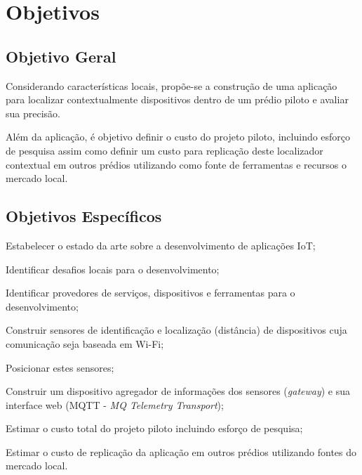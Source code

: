 
\section{Objetivos}
\label{sec:Objetivos}

\subsection{Objetivo Geral}
\label{subsec:Objetivo Geral}

Considerando características locais, propõe-se a construção de uma aplicação
para localizar contextualmente dispositivos dentro de um prédio piloto e avaliar
sua precisão.

Além da aplicação, é objetivo definir o custo do projeto piloto, incluindo
esforço de pesquisa assim como definir um custo para replicação deste
localizador contextual em outros prédios utilizando como fonte de ferramentas e
recursos o mercado local.

\subsection{Objetivos Específicos}
\label{subsec:Objetivos Específicos}

\begin{alineas}

	\item Estabelecer o estado da arte sobre a desenvolvimento de aplicações IoT;

	\item Identificar desafios locais para o desenvolvimento;

	\item Identificar provedores de serviços, dispositivos e ferramentas para o
desenvolvimento;

	\item Construir sensores de identificação e localização (distância) de
 dispositivos cuja comunicação seja baseada em Wi-Fi;

	\item Posicionar estes sensores;

	\item Construir um dispositivo agregador de informações dos sensores
 (\emph{gateway}) e sua interface web (MQTT - \emph{MQ Telemetry Transport});

	\item Estimar o custo total do projeto piloto incluindo esforço de pesquisa;

	\item Estimar o custo de replicação da aplicação em outros prédios
	utilizando fontes do mercado local.

\end{alineas}
